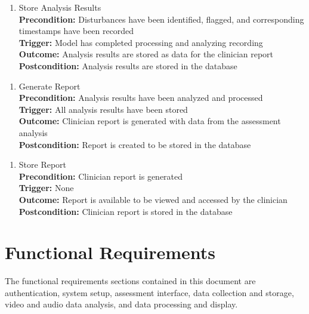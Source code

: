 \documentclass[12pt]{article}
\begin{document}
\begin{enumerate}[label={PUC-}29. ]
  \item Store Analysis Results\\
  \textbf{Precondition: }Disturbances have been identified, flagged, and corresponding timestamps have been recorded\\
  \textbf{Trigger: }Model has completed processing and analyzing recording\\
  \textbf{Outcome: }Analysis results are stored as data for the clinician report\\
  \textbf{Postcondition: }Analysis results are stored in the database\\
\end{enumerate}

\begin{enumerate}[label={PUC-}30. ]
  \item Generate Report\\
  \textbf{Precondition: }Analysis results have been analyzed and processed\\
  \textbf{Trigger: }All analysis results have been stored\\
  \textbf{Outcome: }Clinician report is generated with data from the assessment analysis\\
  \textbf{Postcondition: }Report is created to be stored in the database\\
\end{enumerate}

\begin{enumerate}[label={PUC-}31. ]
  \item Store Report\\
  \textbf{Precondition: }Clinician report is generated\\
  \textbf{Trigger: }None\\
  \textbf{Outcome: }Report is available to be viewed and accessed by the clinician\\
  \textbf{Postcondition: }Clinician report is stored in the database\\
\end{enumerate}

\newpage

\section{Functional Requirements}
\hspace{2em}The functional requirements sections contained in this document are authentication, system setup, assessment interface, data collection and storage, video and audio
data analysis, and data processing and display.
\end{document}
